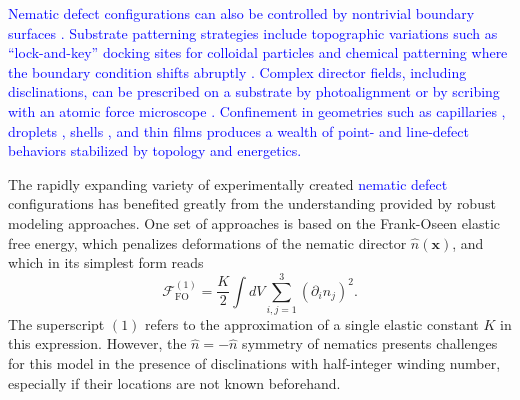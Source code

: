 \documentclass[utf8]{frontiersFPHY} %
\newcommand{\DAB}[1]{\textcolor{blue}{#1}}
\begin{document}
\DAB{Nematic defect configurations can also be controlled by nontrivial boundary surfaces \cite{serra2016curvature}. Substrate patterning strategies include  topographic variations such as ``lock-and-key'' docking sites for colloidal particles \cite{hung2007nanoparticles,eskandari2014particlesoftmatter,luo2016experimental} and   chemical patterning where the boundary condition shifts abruptly \cite{guillamat2014electric,kos2015relevance}. %
Complex director fields, including disclinations, can be prescribed on a substrate by photoalignment \cite{peng2015liquid} or by scribing with an atomic force microscope \cite{murray2014creating}. Confinement in geometries such as capillaries \cite{williams1973screw}, droplets \cite{volovik1983topological}, shells \cite{nelson2002toward}, and thin films \cite{Lavrentovich1990} produces a wealth of point- and line-defect behaviors stabilized by topology and energetics.}

The rapidly expanding variety of experimentally created \DAB{nematic defect} configurations has benefited greatly from the understanding provided by robust modeling approaches.  One set of approaches is based on the Frank-Oseen elastic free energy, which penalizes deformations of the nematic director $\hat n(\mathbf{x})$, and which in its simplest form reads
\begin{equation}\label{eq: FrankOseen}
\mathcal F_{\mathrm{FO}}^{(1)} = \frac{K}{2} \int dV \sum_{i,j=1}^3 (\partial_i n_j)^2. 
\end{equation}
The superscript $(1)$ refers to the approximation of a single elastic constant $K$ in this expression. %
However, the $\hat n = - \hat n $ symmetry of nematics presents challenges for this model in the presence of disclinations with half-integer winding number, especially if their locations are not known beforehand.  
\end{document}
